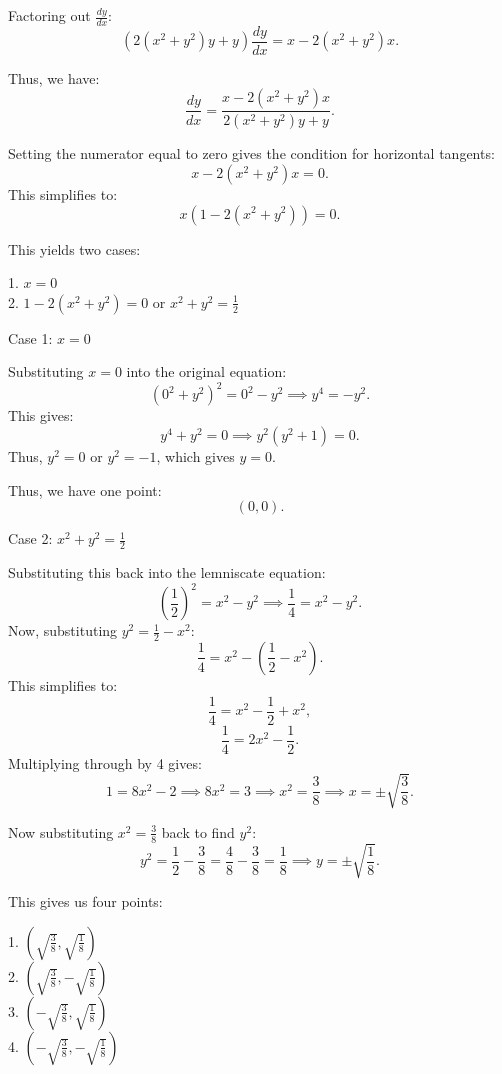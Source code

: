 \documentclass[12pt]{article}
\begin{document}
\begin{enumerate}[start=1,label={\bfseries. },leftmargin=1in]
    Factoring out \(\frac{dy}{dx}\):
    \[
    \left(2(x^2 + y^2)y + y\right) \frac{dy}{dx} = x - 2(x^2 + y^2)x.
    \]

    Thus, we have:
    \[
    \frac{dy}{dx} = \frac{x - 2(x^2 + y^2)x}{2(x^2 + y^2)y + y}.
    \]

    Setting the numerator equal to zero gives the condition for horizontal tangents:
    \[
    x - 2(x^2 + y^2)x = 0.
    \]
    This simplifies to:
    \[
    x(1 - 2(x^2 + y^2)) = 0.
    \]

    This yields two cases:
    
    1. \(x = 0\)\\
    2. \(1 - 2(x^2 + y^2) = 0\) or \(x^2 + y^2 = \frac{1}{2}\)

    Case 1: \(x = 0\)

    Substituting \(x = 0\) into the original equation:
    \[
    (0^2 + y^2)^2 = 0^2 - y^2 \implies y^4 = -y^2.
    \]
    This gives:
    \[
    y^4 + y^2 = 0 \implies y^2(y^2 + 1) = 0.
    \]
    Thus, \(y^2 = 0\) or \(y^2 = -1\), which gives \(y = 0\).

    Thus, we have one point:
    \[
    (0, 0).
    \]

    Case 2: \(x^2 + y^2 = \frac{1}{2}\)

    Substituting this back into the lemniscate equation:
    \[
    \left(\frac{1}{2}\right)^2 = x^2 - y^2 \implies \frac{1}{4} = x^2 - y^2.
    \]
    Now, substituting \(y^2 = \frac{1}{2} - x^2\):
    \[
    \frac{1}{4} = x^2 - \left(\frac{1}{2} - x^2\right).
    \]
    This simplifies to:
    \[
    \frac{1}{4} = x^2 - \frac{1}{2} + x^2,
    \]
    \[
    \frac{1}{4} = 2x^2 - \frac{1}{2}.
    \]
    Multiplying through by 4 gives:
    \[
    1 = 8x^2 - 2 \implies 8x^2 = 3 \implies x^2 = \frac{3}{8} \implies x = \pm\sqrt{\frac{3}{8}}.
    \]

    Now substituting \(x^2 = \frac{3}{8}\) back to find \(y^2\):
    \[
    y^2 = \frac{1}{2} - \frac{3}{8} = \frac{4}{8} - \frac{3}{8} = \frac{1}{8} \implies y = \pm \sqrt{\frac{1}{8}}.
    \]

    This gives us four points:
    
    1. \(\left(\sqrt{\frac{3}{8}}, \sqrt{\frac{1}{8}}\right)\)\\
    2. \(\left(\sqrt{\frac{3}{8}}, -\sqrt{\frac{1}{8}}\right)\)\\
    3. \(\left(-\sqrt{\frac{3}{8}}, \sqrt{\frac{1}{8}}\right)\)\\
    4. \(\left(-\sqrt{\frac{3}{8}}, -\sqrt{\frac{1}{8}}\right)\)\\


\end{enumerate}
\end{document}
